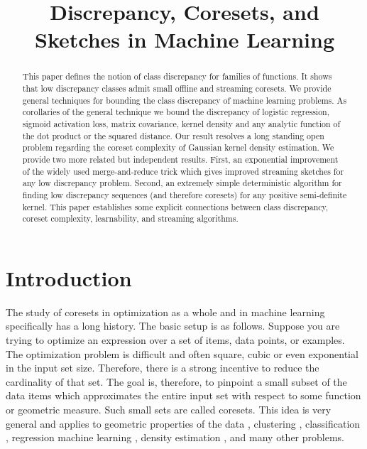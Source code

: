 \documentclass[anon,12pt]{colt2019} %
\title[Discrepancy, Coresets, and Sketches in Machine Learning]{Discrepancy, Coresets, and Sketches in Machine Learning}
\begin{document}
\maketitle

\begin{abstract}
This paper defines the notion of class discrepancy for families of functions.  It shows that low discrepancy classes admit small offline and streaming coresets. We provide general techniques for bounding the class discrepancy of machine learning problems. 
As corollaries of the general technique we bound the discrepancy of logistic regression, sigmoid activation loss, matrix covariance, kernel density and any analytic function of the dot product or the squared distance.
Our result resolves a long standing open problem regarding the coreset complexity of Gaussian kernel density estimation.  
We provide two more related but independent results. 
First, an exponential improvement of the widely used merge-and-reduce trick which gives improved streaming sketches for any low discrepancy problem.
Second, an extremely simple deterministic algorithm for finding low discrepancy sequences (and therefore coresets) for any positive semi-definite kernel. 
This paper establishes some explicit connections between class discrepancy, coreset complexity, learnability, and streaming algorithms. 
\end{abstract}


\section{Introduction}
The study of coresets in optimization as a whole and in machine learning specifically has a long history. 
The basic setup is as follows.
Suppose you are trying to optimize an expression over a set of items, data points, or examples.
The optimization problem is difficult and often square, cubic or even exponential in the input set size.
Therefore, there is a strong incentive to reduce the cardinality of that set. 
The goal is, therefore, to pinpoint a small subset of the data items which approximates the entire input set with respect to some function or geometric measure. Such small sets are called coresets. 
This idea is very general and applies to geometric properties of the data \cite{agarwal2005geometric}, 
clustering \cite{DBLP:conf/compgeom/Har-PeledK05} \cite{DBLP:conf/stoc/FeldmanL11}, classification \cite{DBLP:conf/ijcai/Har-PeledRZ07}, regression \cite{DBLP:conf/nips/MunteanuSSW18} 
machine learning \cite{bachem2017practical}, density estimation \cite{DBLP:journals/corr/abs-1802-01751}, and many other problems. 
\end{document}
